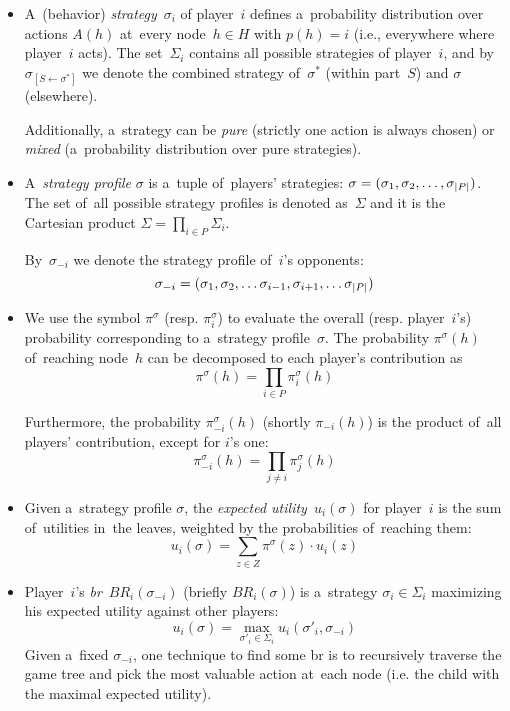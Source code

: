 \begin{itemize}
  \item A~(behavior) \emph{strategy}~$\sigma_i$ of player~$i$ defines a~probability distribution over actions $A(h)$ at~every node~$h \in H$ with $p(h) = i$ (i.e., everywhere where player~$i$ acts).
    The set~$\Sigma_i$ contains all possible strategies of player~$i$, and by $\sigma_{[S \leftarrow \sigma^*]}$ we denote the combined strategy of~$\sigma^*$ (within part~$S$) and $\sigma$ (elsewhere).

  Additionally, a~strategy can be \emph{pure} (strictly one action is always chosen) or \emph{mixed} (a~probability distribution over pure strategies).

  \item A~\emph{strategy profile} $\sigma$ is a~tuple of~players' strategies:
    $\sigma = (\sigma_1, \sigma_2, \ldots, \sigma_ {\left|{P}\right|})$.
    The set of~all possible strategy profiles is denoted as~$\Sigma$ and it is the Cartesian product $\Sigma = \prod_{i \in P} \Sigma_i$.

    By~$\sigma_{-i}$ we denote the strategy profile of~$i$'s opponents:
    \[ \sigma_{-i} = (\sigma_1, \sigma_2, \ldots \sigma_{i-1}, \sigma_{i+1}, \ldots \sigma_ {\left|{P}\right|}) \]

  \item We use the symbol $\pi^\sigma$ (resp. $\pi_i^\sigma$) to evaluate the overall (resp. player~$i$'s) probability corresponding to a~strategy profile~$\sigma$.
    The probability $\pi^\sigma(h)$ of~reaching node~$h$ can be decomposed to each player's contribution as
    \[ \pi ^\sigma(h) = \prod _{i \in P} \pi _i ^\sigma (h) \]

    Furthermore, the probability $\pi _{-i} ^\sigma (h)$ (shortly $\pi _{-i} (h)$) is the product of~all players' contribution, except for $i$'s one:
    \[ \pi _{-i} ^\sigma(h) = \prod _{j \ne i} \pi _j ^\sigma (h) \]
    
  \item Given a~strategy profile $\sigma$, the \emph{expected utility}~$u_i (\sigma)$ for player~$i$
    is the sum of~utilities in~the leaves, weighted by the probabilities of~reaching them:
    \[ u_i (\sigma) = \sum _{z \in Z} \pi^\sigma\!(z) \cdot u_i(z)\]

  \item Player~$i$'s \emph{\acrlong{br}}~$BR _i (\sigma _{-i})$ (briefly $BR _i (\sigma)$) is a~strategy $\sigma _i \in \Sigma _i$ maximizing his expected utility against other players:
    \[ u_i (\sigma) = \max _{\sigma'_i \in \Sigma_i} u_i (\sigma'_i, \sigma_{-i}) \]
    Given a~fixed $\sigma_{-i}$, one technique to find some \acrshort{br} is to recursively traverse the game tree and pick the most valuable action at~each node (i.e. the child with the maximal expected utility).


\end{itemize}
